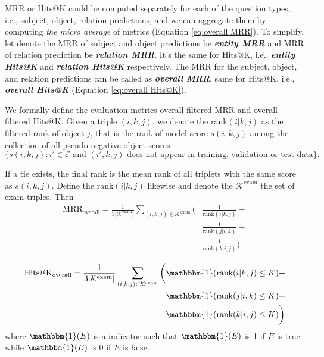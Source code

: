 MRR or Hits@K could be computed separately for each of the question types, i.e., subject, object, relation predictions, and we can aggregate them by computing \textit{the micro average} of metrics (Equation \ref{eq:overall MRR}). To simplify, let denote the MRR of subject and object predictions be \textit{\textbf{entity MRR}} and MRR of relation prediction be \textit{\textbf{relation MRR}}. It's the same for Hits@K, i.e., \textit{\textbf{entity Hits@K}} and \textit{\textbf{relation Hits@K}} respectively. The MRR for the subject, object, and relation predictions can be called as \textit{\textbf{overall MRR}}, same for Hits@K, i.e., \textit{\textbf{overall Hits@K}} (Equation \ref{eq:overall Hits@K}). 

We formally define the evaluation metrics overall filtered MRR and overall filtered Hits@K. Given a triple $(i,k,j)$, we denote the rank$(i|k,j)$ as the filtered rank of object $j$, that is the rank of model score $s(i,k,j)$ among the collection of all pseudo-negative object scores $$\{s(i,k,j): i' \in \mathcal{E} \text{ and } (i',k,j) \text{ does not appear in training, validation or test data} \}\text{.}$$

If a tie exists, the final rank is the mean rank of all triplets with the same score as $s(i,k,j)$. Define the rank$(i|k,j)$ likewise and denote the $\mathcal{K}^{\text{exam}}$ the set of exam triples. Then
\begin{equation}
 \begin{split}
\label{eq:overall MRR}
    \text{MRR}_{\text{overall}} =\frac{1}{3|\mathcal{K}^{\text{exam}}|}
    \sum_{(i,k,j)\in\mathcal{K}^{\text{exam}}}  \bigg(
    & \frac{1}{\text{rank}(i|k,j)} + \\
    & \frac{1}{\text{rank}(j|i,k)} + \\
    & \frac{1}{\text{rank}(k|i,j)} \bigg) 
\end{split}
\end{equation}

\begin{equation}
\label{eq:overall Hits@K}
\begin{split}
    \text{Hits@K}_{\text{overall}} =
    \frac{1}{3|\mathcal{K}^{\text{exam}}|}
    \sum_{(i,k,j)\in\mathcal{K}^{\text{exam}}}
    \bigg(
    & \mathbbm{1}(\text{rank}(i|k,j) \leq K) + \\
    & \mathbbm{1}(\text{rank}(j|i,k) \leq K) + \\
    & \mathbbm{1}(\text{rank}(k|i,j) \leq K)
    \bigg) 
\end{split}
\end{equation}
\noindent where $\mathbbm{1}(E)$ is a indicator such that $\mathbbm{1}(E)$ is 1 if $E$ is true while $\mathbbm{1}(E)$ is 0 if $E$ is false.



